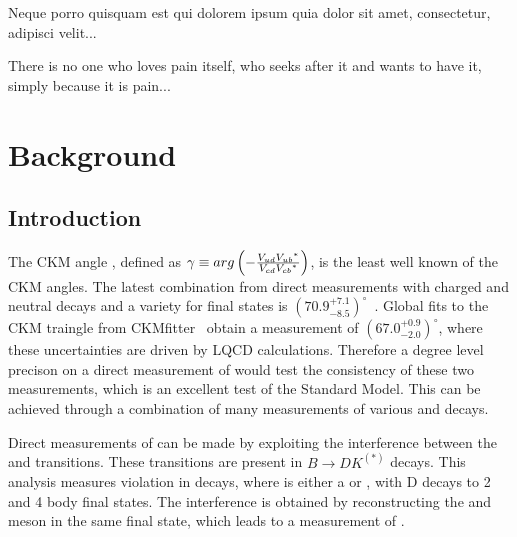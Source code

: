 \begin{savequote}[8cm]
\textlatin{Neque porro quisquam est qui dolorem ipsum quia dolor sit amet, consectetur, adipisci velit...}

There is no one who loves pain itself, who seeks after it and wants to have it, simply because it is pain...
\end{savequote}

\chapter{\label{ch:2-background}Background} 

\minitoc

\section{Introduction}
\label{sec:Introduction}

The CKM angle \Pgamma, defined as $\gamma \equiv arg\left(-\frac{{V_{{u}{d}}}{{V_{{u}{b}}}}^*}{{V_{{c}{d}}}{{V_{{c}{b}}}}^*}\right)$, is the least well known of the CKM angles. The latest \lhcb combination from direct measurements with charged and neutral \B decays and a variety for \D final states is $\left(70.9^{+7.1}_{-8.5}\right)^{\circ}$~\cite{LHCB-PAPER-2016-032-001}. Global fits to the CKM traingle from CKMfitter~\cite{CKMfitter2015} obtain a \Pgamma measurement of $(67.0^{+0.9}_{-2.0})^{\circ}$, where these uncertainties are driven by LQCD calculations. Therefore a degree level precison on a direct measurement of \Pgamma would test the consistency of these two measurements, which is an excellent test of the Standard Model. This can be achieved through a combination of many measurements of various \B and \D decays.

Direct measurements of \Pgamma can be made by exploiting the interference between the \decay{\bquark}{\cquark\uquarkbar\squark} and \decay{\bquark}{\uquark\cquarkbar\squark} transitions. These transitions are present in $B \to DK^{(*)}$ decays. This analysis measures \CP violation in \decay{\Bpm}{\D\Kstarpm} decays, where \D is either a \Dz or \Dzb, with D decays to 2 and 4 body final states. The interference is obtained by reconstructing the \Dz and \Dzb meson in the same final state, which leads to a measurement of \Pgamma.

